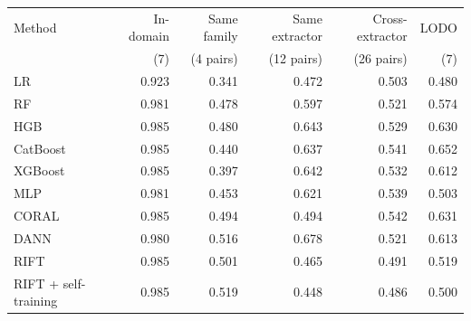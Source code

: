 \begin{tabular}{lrrrrr}
\toprule
Method & In-domain & Same family & Same extractor & Cross-extractor & LODO \\
 & (7) & (4 pairs) & (12 pairs) & (26 pairs) & (7) \\
\midrule
LR & 0.923 & 0.341 & 0.472 & 0.503 & 0.480 \\
RF & 0.981 & 0.478 & 0.597 & 0.521 & 0.574 \\
HGB & 0.985 & 0.480 & 0.643 & 0.529 & 0.630 \\
CatBoost & 0.985 & 0.440 & 0.637 & 0.541 & 0.652 \\
XGBoost & 0.985 & 0.397 & 0.642 & 0.532 & 0.612 \\
MLP & 0.981 & 0.453 & 0.621 & 0.539 & 0.503 \\
CORAL & 0.985 & 0.494 & 0.494 & 0.542 & 0.631 \\
DANN & 0.980 & 0.516 & 0.678 & 0.521 & 0.613 \\
RIFT & 0.985 & 0.501 & 0.465 & 0.491 & 0.519 \\
RIFT + self-training & 0.985 & 0.519 & 0.448 & 0.486 & 0.500 \\
\bottomrule
\end{tabular}

